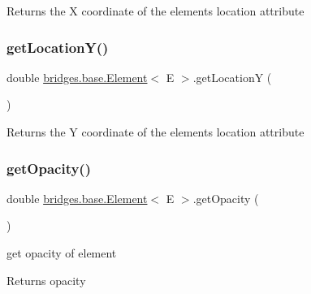 \begin{DoxyReturn}{Returns}
the X coordinate of the element\textquotesingle{}s location attribute 
\end{DoxyReturn}
\mbox{\label{classbridges_1_1base_1_1_element_a3cfd6af5ca4cae0596845f62018ce004}} 
\subsubsection{\texorpdfstring{getLocationY()}{getLocationY()}}
{\footnotesize\ttfamily double \mbox{\hyperlink{classbridges_1_1base_1_1_element}{bridges.\+base.\+Element}}$<$ E $>$.get\+LocationY (\begin{DoxyParamCaption}{ }\end{DoxyParamCaption})}

\begin{DoxyReturn}{Returns}
the Y coordinate of the element\textquotesingle{}s location attribute 
\end{DoxyReturn}
\mbox{\label{classbridges_1_1base_1_1_element_a1427af7efc2d5bc93e00a6a95d268c4d}} 
\subsubsection{\texorpdfstring{getOpacity()}{getOpacity()}}
{\footnotesize\ttfamily double \mbox{\hyperlink{classbridges_1_1base_1_1_element}{bridges.\+base.\+Element}}$<$ E $>$.get\+Opacity (\begin{DoxyParamCaption}{ }\end{DoxyParamCaption})}

get opacity of element

\begin{DoxyReturn}{Returns}
opacity 
\end{DoxyReturn}
\mbox{\label{classbridges_1_1base_1_1_element_aa0fe02d2f5491cf21cc6741f592536a8}} 
